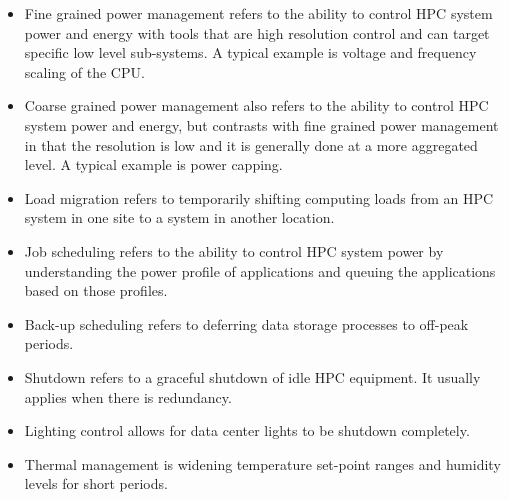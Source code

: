 \begin{itemize}
\item Fine grained power management refers to the ability to control HPC system power 
and energy with tools that are high resolution control and can target specific 
low level sub-systems. A typical example is voltage and frequency scaling of the CPU.

\item Coarse grained power management also refers to the ability to control HPC 
system power and energy, but contrasts with fine grained power management in 
that the resolution is low and it is generally done at a more aggregated level. 
A typical example is power capping.

\item Load migration refers to temporarily shifting computing loads from 
an HPC system in one site to a system in another location.

\item Job scheduling refers to the ability to control HPC system power 
by understanding the power profile of applications and queuing the 
applications based on those profiles.

\item Back-up scheduling refers to deferring data storage processes to off-peak periods.

\item Shutdown refers to a graceful shutdown of idle HPC equipment. It usually 
applies when there is redundancy.

\item Lighting control allows for data center lights to be shutdown completely.

\item Thermal management is widening temperature set-point ranges and 
humidity levels for short periods.
\end{itemize}